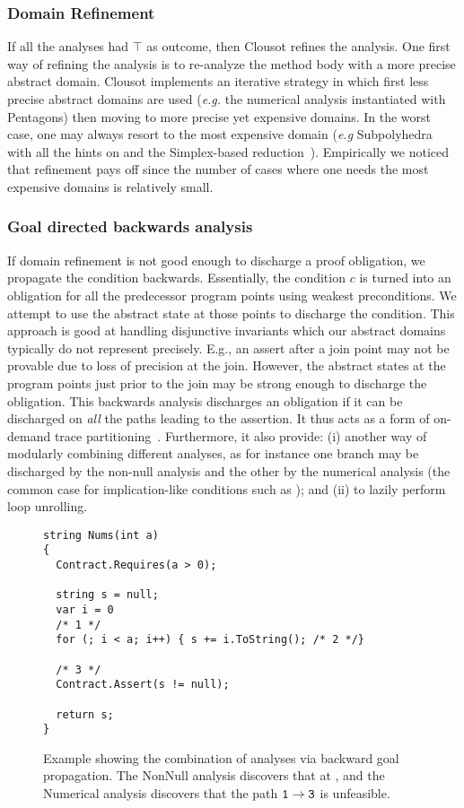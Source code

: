 \documentclass{llncs}
\begin{document}
\subsubsection{Domain Refinement}
If all the analyses had $\top$ as outcome, then Clousot refines the
analysis.  One first way of refining the analysis is to re-analyze the
method body with a more precise abstract domain.  Clousot implements
an iterative strategy in which first less precise abstract domains are
used (\emph{e.g.} the numerical analysis instantiated with Pentagons)
then moving to more precise yet expensive domains.  In the worst case,
one may always resort to the most expensive domain (\emph{e.g}
Subpolyhedra with all the hints on and the Simplex-based
reduction~\cite{LavironLogozzo09-1}).  
Empirically we noticed that refinement pays
off since the number of cases where one needs the most expensive
domains is relatively small.
 
\subsubsection{Goal directed backwards analysis}
If domain refinement is not good enough to discharge a proof
obligation, we propagate the condition backwards.  Essentially, the
condition $c$ is turned into an obligation for all the predecessor
program points using weakest preconditions.  We attempt to use the
abstract state at those points to discharge the condition.  This
approach is good at handling disjunctive invariants which our
abstract domains typically do not represent precisely.  E.g., an
assert after a join point may not be provable due to loss of precision
at the join.  However, the abstract states at the program points just
prior to the join may be strong enough to discharge the obligation.
This backwards analysis discharges an obligation if it can be
discharged on \emph{all} the paths leading to the assertion.  It thus
acts as a form of on-demand trace
partitioning~\cite{tracepartitioning}.  Furthermore, it also provide:
(i) another way of modularly combining different analyses, as for
instance one branch may be discharged by the non-null analysis and the
other by the numerical analysis (the common case for implication-like
conditions such as  \code{||} );
and (ii) to lazily perform loop unrolling.  

\begin{figure}[t]
\begin{lstlisting}
string Nums(int a)
{
  Contract.Requires(a > 0);

  string s = null;
  var i = 0
  /* 1 */
  for (; i < a; i++) { s += i.ToString(); /* 2 */}

  /* 3 */
  Contract.Assert(s != null);

  return s;
}
\end{lstlisting}
\caption{Example showing the combination of analyses via backward goal propagation.
The NonNull analysis discovers that  at , and the Numerical analysis discovers that the path $\mathtt{1} \rightarrow \mathtt{3}$ is unfeasible.}
\label{fig:wp}
\end{figure}
\end{document}
